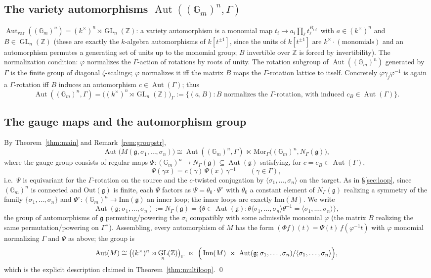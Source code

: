 \documentclass{amsart}
\theoremstyle{definition}
\DeclareMathOperator{\Aut}{Aut}
\DeclareMathOperator{\GL}{GL}
\newcommand{\Gm}{\mathbb{G}_m}
\newcommand{\g}{\mathfrak{g}}
\newcommand{\Z}{\mathbb{Z}}
\begin{document}
\subsection{The variety automorphisms $\Aut((\Gm)^n,\Gamma)$}
$\Aut_{\mathrm{var}}((\Gm)^n)=(k^\times)^n\rtimes\GL_n(\Z)$:
a variety automorphism is a monomial map
$t_i\mapsto a_i\prod_\ell t_\ell^{B_{i\ell}}$ with $a\in(k^\times)^n$ and
$B\in\GL_n(\Z)$ (these are exactly the $k$-algebra automorphisms of
$k[t^{\pm1}]$, since the units of $k[t^{\pm1}]$ are $k^\times\cdot
(\text{monomials})$ and an automorphism permutes a generating set of
units up to the monomial group; $B$ invertible over $\Z$ is forced by
invertibility).  The normalization condition: $\varphi$ normalizes the
$\Gamma$-action of rotations by roots of unity.  The rotation subgroup of
$\Aut((\Gm)^n)$ generated by $\Gamma$ is the finite group of
diagonal $\zeta$-scalings; $\varphi$ normalizes it iff the matrix $B$ maps
the $\Gamma$-rotation lattice to itself.  Concretely
$\varphi\gamma_j\varphi^{-1}$ is again a $\Gamma$-rotation iff $B$ induces
an automorphism $c\in\Aut(\Gamma)$; thus
\[
\Aut((\Gm)^n,\Gamma)=
\bigl((k^\times)^n\rtimes\GL_n(\Z)\bigr)_{\Gamma}
:=\{(a,B):B\text{ normalizes the }\Gamma\text{-rotation, with induced }
c_B\in\Aut(\Gamma)\}.
\]

\subsection{The gauge maps and the automorphism group}
By Theorem~\ref{thm:main} and Remark~\ref{rem:groupstr},
\[
\Aut\bigl(M(\g,\sigma_1,\dots,\sigma_n)\bigr)\cong
\Aut((\Gm)^n,\Gamma)\ \ltimes\
\mathrm{Mor}_\Gamma\bigl((\Gm)^n,N_\Gamma(\g)\bigr),
\]
where the gauge group consists of regular maps $\Psi\colon(\Gm)^n\to
N_\Gamma(\g)\subseteq\Aut(\g)$ satisfying, for $c=c_B\in\Aut(\Gamma)$,
\[
\Psi(\gamma x)=c(\gamma)\,\Psi(x)\,\gamma^{-1}\qquad(\gamma\in\Gamma),
\]
i.e.\ $\Psi$ is equivariant for the $\Gamma$-rotation on the source and the
$c$-twisted conjugation by $\langle\sigma_1,\dots,\sigma_n\rangle$ on the
target.  As in \S\ref{sec:loop}, since $(\Gm)^n$ is connected and
$\mathrm{Out}(\g)$ is finite, each $\Psi$ factors as
$\Psi=\theta_0\cdot\Psi^\circ$ with $\theta_0$ a constant element of
$N_\Gamma(\g)$ realizing a symmetry of the family
$\{\sigma_1,\dots,\sigma_n\}$ and $\Psi^\circ\colon(\Gm)^n\to
\mathrm{Inn}(\g)$ an inner loop; the inner loops are exactly
$\mathrm{Inn}(M)$.  We write
\[
\Aut(\g;\sigma_1,\dots,\sigma_n):=N_\Gamma(\g)
=\{\theta\in\Aut(\g):\theta\langle\sigma_1,\dots,\sigma_n\rangle
\theta^{-1}=\langle\sigma_1,\dots,\sigma_n\rangle\},
\]
the group of automorphisms of $\g$ permuting/powering the $\sigma_i$
compatibly with some admissible monomial $\varphi$ (the matrix $B$
realizing the same permutation/powering on $\Gamma^\vee$).  Assembling, every
automorphism of $M$ has the form $(\Phi f)(t)=\Psi(t)\,f(\varphi^{-1}t)$
with $\varphi$ monomial normalizing $\Gamma$ and $\Psi$ as above; the
group is
\[
\Aut(M)\cong
\bigl((k^\times)^n\rtimes\GL_n(\Z)\bigr)_\Gamma\ \ltimes\
\Bigl(\,\mathrm{Inn}(M)\ \rtimes\ \Aut(\g;\sigma_1,\dots,\sigma_n)
/\langle\sigma_1,\dots,\sigma_n\rangle\Bigr),
\]
which is the explicit description claimed in
Theorem~\ref{thm:multiloop}. \qed
\end{document}
